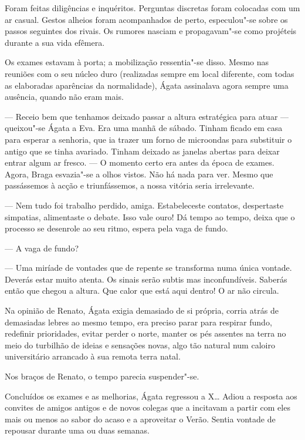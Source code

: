 Foram feitas diligências e inquéritos. Perguntas discretas foram
colocadas com um ar casual. Gestos alheios foram acompanhados de
perto, especulou"-se sobre os passos seguintes dos rivais. Os rumores
nasciam e propagavam"-se como projéteis durante a sua vida efêmera.

Os exames estavam à porta; a mobilização ressentia"-se disso. Mesmo nas
reuniões com o seu núcleo duro (realizadas sempre em local diferente,
com todas as elaboradas aparências da normalidade), Ágata assinalava
agora sempre uma ausência, quando não eram mais.

--- Receio bem que tenhamos deixado passar a altura estratégica para
  atuar --- queixou"-se Ágata a Eva. Era uma manhã de sábado. Tinham
  ficado em casa para esperar a senhoria, que ia trazer um forno de
  microondas para substituir o antigo que se tinha avariado. Tinham
  deixado as janelas abertas para deixar entrar algum ar fresco. --- O
  momento certo era antes da época de exames. Agora, Braga esvazia"-se a
  olhos vistos. Não há nada para ver. Mesmo que passássemos à acção e
  triunfássemos, a nossa vitória seria irrelevante.

--- Nem tudo foi trabalho perdido, amiga. Estabeleceste contatos,
  despertaste simpatias, alimentaste o debate. Isso vale ouro! Dá tempo
  ao tempo, deixa que o processo se desenrole ao seu ritmo, espera
  pela vaga de fundo.

--- A vaga de fundo?

--- Uma miríade de vontades que de repente se transforma numa única
  vontade. Deverás estar muito atenta. Os sinais serão subtis mas
  inconfundíveis. Saberás então que chegou a altura. Que calor que está
  aqui dentro! O ar não circula.

Na opinião de Renato, Ágata exigia demasiado de si própria, corria atrás
de demasiadas lebres ao mesmo tempo, era preciso parar para respirar
fundo, redefinir prioridades, evitar perder o norte, manter os pés
assentes na terra no meio do turbilhão de ideias e sensações novas, algo
tão natural num caloiro universitário arrancado à sua remota terra
natal.

Nos braços de Renato, o tempo parecia suspender"-se.

Concluídos os exames e as melhorias, Ágata regressou a X\ldots{} Adiou a
resposta aos convites de amigos antigos e de novos colegas que a
incitavam a partir com eles mais ou menos ao sabor do acaso e a
aproveitar o Verão. Sentia vontade de repousar durante uma ou duas
semanas.

